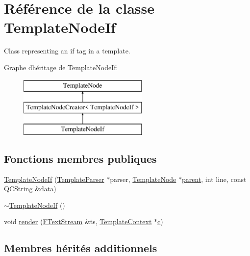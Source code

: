 \hypertarget{class_template_node_if}{}\section{Référence de la classe Template\+Node\+If}
\label{class_template_node_if}


Class representing an \textquotesingle{}if\textquotesingle{} tag in a template.  


Graphe d\textquotesingle{}héritage de Template\+Node\+If\+:\begin{figure}[H]
\begin{center}
\leavevmode
\includegraphics[height=3.000000cm]{class_template_node_if}
\end{center}
\end{figure}
\subsection*{Fonctions membres publiques}
\begin{DoxyCompactItemize}
\item 
\hyperlink{class_template_node_if_acfd56d480c2f1fcb8dceeb102de8e6c4}{Template\+Node\+If} (\hyperlink{class_template_parser}{Template\+Parser} $\ast$parser, \hyperlink{class_template_node}{Template\+Node} $\ast$\hyperlink{class_template_node_a69a306ef84e62af9fe57bf9aacc94536}{parent}, int line, const \hyperlink{class_q_c_string}{Q\+C\+String} \&data)
\item 
\hyperlink{class_template_node_if_aed947924c57751b8600061cfe4beea34}{$\sim$\+Template\+Node\+If} ()
\item 
void \hyperlink{class_template_node_if_a46c83e893905d8ad57df4cd9a76ada42}{render} (\hyperlink{class_f_text_stream}{F\+Text\+Stream} \&ts, \hyperlink{class_template_context}{Template\+Context} $\ast$\hyperlink{060__command__switch_8tcl_ab14f56bc3bd7680490ece4ad7815465f}{c})
\end{DoxyCompactItemize}
\subsection*{Membres hérités additionnels}


